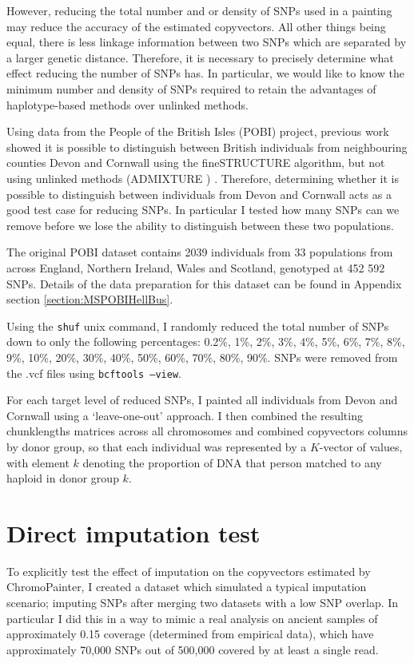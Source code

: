 {However, reducing the total number and or density of SNPs used in a painting may reduce the accuracy of the estimated copyvectors. All other things being equal, there is less linkage information between two SNPs which are separated by a larger genetic distance. Therefore, it is necessary to precisely determine what effect reducing the number of SNPs has. In particular, we would like to know the minimum number and density of SNPs required to retain the advantages of haplotype-based methods over unlinked methods. 

Using data from the People of the British Isles (POBI) project, previous work showed it is possible to distinguish between British individuals from neighbouring counties Devon and Cornwall using the fineSTRUCTURE algorithm, but not using unlinked methods (ADMIXTURE \cite{alexander2009fast}) \cite{Leslie2015}. Therefore, determining whether it is possible to distinguish between individuals from Devon and Cornwall acts as a good test case for reducing SNPs. In particular I tested how many SNPs can we remove before we lose the ability to distinguish between these two populations.


The original POBI dataset contains 2039 individuals from 33 populations from across England, Northern Ireland, Wales and Scotland, genotyped at 452 592 SNPs. Details of the data preparation for this dataset can be found in Appendix section \ref{section:MSPOBIHellBus}.

Using the \texttt{shuf} unix command, I randomly reduced the total number of SNPs down to only the following percentages: 0.2\%, 1\%, 2\%, 3\%, 4\%, 5\%, 6\%, 7\%, 8\%, 9\%, 10\%, 20\%, 30\%, 40\%, 50\%, 60\%, 70\%, 80\%, 90\%. SNPs were removed from the .vcf files using \texttt{bcftools --view}.

For each target level of reduced SNPs, I painted all individuals from Devon and Cornwall using a `leave-one-out' approach. I then combined the resulting chunklengths matrices across all chromosomes and combined copyvectors columns by donor group, so that each individual was represented by a $K$-vector of values, with element $k$ denoting the proportion of DNA that person matched to any haploid in donor group $k$.

\section{Direct imputation test}

To explicitly test the effect of imputation on the copyvectors estimated by ChromoPainter, I created a dataset which simulated a typical imputation scenario; imputing SNPs after merging two datasets with a low SNP overlap. In particular I did this in a way to mimic a real analysis on ancient samples of approximately 0.15 coverage (determined from empirical data), which have approximately 70,000 SNPs out of 500,000 covered by at least a single read. 

}
